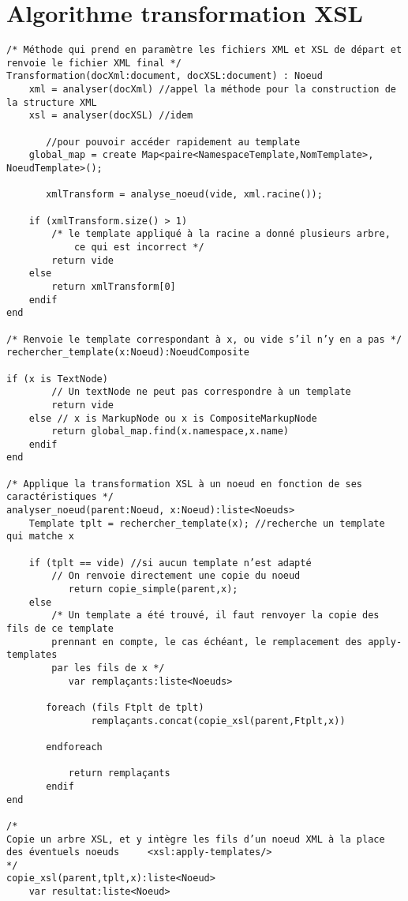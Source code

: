 \section{Algorithme transformation XSL}
\begin{verbatim}
/* Méthode qui prend en paramètre les fichiers XML et XSL de départ et renvoie le fichier XML final */
Transformation(docXml:document, docXSL:document) : Noeud
    xml = analyser(docXml) //appel la méthode pour la construction de la structure XML
    xsl = analyser(docXSL) //idem   

       //pour pouvoir accéder rapidement au template
    global_map = create Map<paire<NamespaceTemplate,NomTemplate>, NoeudTemplate>();    

       xmlTransform = analyse_noeud(vide, xml.racine());

    if (xmlTransform.size() > 1)
        /* le template appliqué à la racine a donné plusieurs arbre,
            ce qui est incorrect */
        return vide
    else
        return xmlTransform[0]
    endif
end

/* Renvoie le template correspondant à x, ou vide s’il n’y en a pas */
rechercher_template(x:Noeud):NoeudComposite

if (x is TextNode)
        // Un textNode ne peut pas correspondre à un template
        return vide
    else // x is MarkupNode ou x is CompositeMarkupNode
        return global_map.find(x.namespace,x.name)
    endif
end

/* Applique la transformation XSL à un noeud en fonction de ses caractéristiques */
analyser_noeud(parent:Noeud, x:Noeud):liste<Noeuds>
    Template tplt = rechercher_template(x); //recherche un template qui matche x

    if (tplt == vide) //si aucun template n’est adapté
        // On renvoie directement une copie du noeud
           return copie_simple(parent,x);
    else
        /* Un template a été trouvé, il faut renvoyer la copie des fils de ce template
        prennant en compte, le cas échéant, le remplacement des apply-templates
        par les fils de x */
           var remplaçants:liste<Noeuds>

       foreach (fils Ftplt de tplt)
               remplaçants.concat(copie_xsl(parent,Ftplt,x))

       endforeach

           return remplaçants
       endif
end

/*
Copie un arbre XSL, et y intègre les fils d’un noeud XML à la place des éventuels noeuds     <xsl:apply-templates/>
*/
copie_xsl(parent,tplt,x):liste<Noeud>
    var resultat:liste<Noeud>


\end{verbatim}
